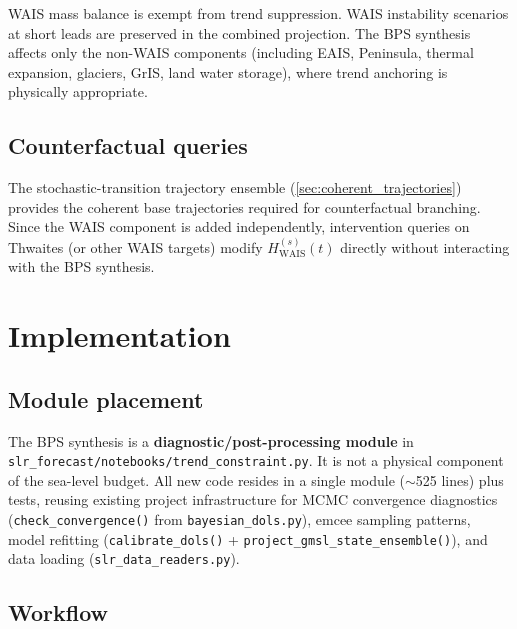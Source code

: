 \documentclass[11pt]{article}
\begin{document}
WAIS mass balance is exempt from trend suppression.  WAIS instability scenarios at short leads are preserved in the combined projection.  The BPS synthesis affects only the non-WAIS components (including EAIS, Peninsula, thermal expansion, glaciers, GrIS, land water storage), where trend anchoring is physically appropriate.

\subsection{Counterfactual queries}

The stochastic-transition trajectory ensemble (\cref{sec:coherent_trajectories}) provides the coherent base trajectories required for counterfactual branching.  Since the WAIS component is added independently, intervention queries on Thwaites (or other WAIS targets) modify $H_{\mathrm{WAIS}}^{(s)}(t)$ directly without interacting with the BPS synthesis.


\section{Implementation}

\subsection{Module placement}

The BPS synthesis is a \textbf{diagnostic/post-processing module} in \texttt{slr\_forecast/notebooks/trend\_constraint.py}.  It is not a physical component of the sea-level budget.  All new code resides in a single module ($\sim$525 lines) plus tests, reusing existing project infrastructure for MCMC convergence diagnostics (\texttt{check\_convergence()} from \texttt{bayesian\_dols.py}), emcee sampling patterns, model refitting (\texttt{calibrate\_dols()} + \texttt{project\_gmsl\_state\_ensemble()}), and data loading (\texttt{slr\_data\_readers.py}).

\subsection{Workflow}
\end{document}
